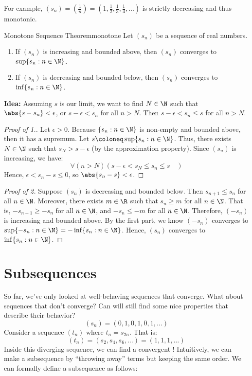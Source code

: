 For example, $(s_n) = \left( \frac{1}{n} \right) = \left(1, \frac12, \frac13, \frac14, \ldots \right)$ is strictly decreasing and thus monotonic.

\begin{thmbox}{Monotone Sequence Theorem}{monotone}
    Let $(s_n)$ be a sequence of real numbers.
    \begin{enumerate}
        \item If $(s_n)$ is increasing and bounded above, then $(s_n)$ converges to $\sup \{ s_n : n \in \N \}$.
        \item If $(s_n)$ is decreasing and bounded below, then $(s_n)$ converges to $\inf\{s_n : n \in \N \}$.
    \end{enumerate}
    \tcblower
    \textbf{Idea:} Assuming $s$ is our limit, we want to find $N \in \N$ such that $\abs{s - s_n} < \epsilon$, or $s - \epsilon < s_n$ for all $n > N$. Then $s - \epsilon < s_n \leq s$ for all $n > N$.
    \begin{proof}[Proof of 1.]
        Let $\epsilon > 0$. Because $\{s_n : n \in \N\}$ is non-empty and bounded above, then it has a supremum. Let $s \coloneq \sup\{s_n : n \in \N \}$. Thus, there exists $N \in \N$ such that $s_N > s - \epsilon$ (by the approximation property). Since $(s_n)$ is increasing, we have:
        \[ \forall (n > N) \left(s - \epsilon < s_N \leq s_n \leq s \quad \right) \]
        Hence, $\epsilon < s_n - s \leq 0$, so $\abs{s_n - s} < \epsilon$.
    \end{proof}

    \begin{proof}[Proof of 2]
        Suppose $(s_n)$ is decreasing and bounded below. Then $s_{n+1} \leq s_n$ for all $n \in \N$. Moreover, there exists $m \in \R$ such that $s_n \geq m$ for all $n \in \N$. That is, $- s_{n+1} \geq - s_n$ for all $n \in \N$, and $- s_n \leq -m$ for all $n \in \N$. Therefore, $(-s_n)$ is increasing and bounded above. By the first part, we know $(-s_n)$ converges to $\sup\{ -s_n : n \in \N\} = - \inf\{s_n : n \in \N\}$. Hence, $(s_n)$ converges to $\inf\{s_n : n \in \N\}$.
    \end{proof}
\end{thmbox}

\section{Subsequences}

So far, we've only looked at well-behaving sequences that converge. What about sequences that don't converge? Can will still find some nice properties that describe their behavior?
\[ (s_n) = (0,1,0,1,0,1,\ldots) \]
Consider a sequence $(t_n)$ where $t_n = s_{2n}$. That is:
\[ (t_n) = (s_2, s_4, s_6, \ldots) = (1, 1, 1, \ldots) \]
Inside this diverging sequence, we can find a convergent ! Intuitively, we can make a subsequence by ``throwing away'' terms but keeping the same order. We can formally define a subsequence as follows:

